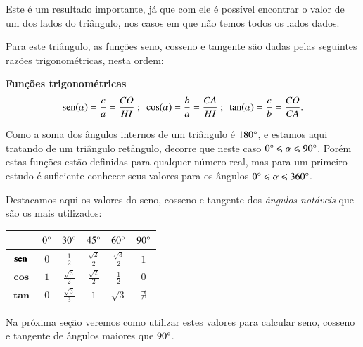  \vskip0.3cm

 Este é um resultado importante, já que com ele é possível encontrar o valor de um dos lados do triângulo, nos casos em que não temos todos os lados dados.

 Para este triângulo, as funções seno, cosseno e tangente são dadas pelas seguintes razões trigonométricas, nesta ordem:

 \vskip0.3cm

\colorbox{azul}{
 \begin{minipage}{0.9\linewidth}
 \begin{center}
 \textbf{Funções trigonométricas}
  \begin{eqnarray*}
   \operatorname{sen}(\alpha)= \frac{c}{a}= \frac{CO}{HI} \ ; \ \
   \cos(\alpha)= \frac{b}{a}= \frac{CA}{HI} \ ; \ \
   \tan(\alpha)= \frac{c}{b}= \frac{CO}{CA}.
 \end{eqnarray*}
 \end{center}
 \end{minipage}}

 \vskip0.3cm

 Como a soma dos ângulos internos de um triângulo é $180 \degree$, e estamos aqui tratando de um triângulo retângulo, decorre que neste caso $0 \degree \leqslant \alpha \leqslant 90 \degree$. Porém estas funções estão definidas para qualquer número real, mas para um primeiro estudo é suficiente conhecer seus valores para os ângulos $0 \degree \leqslant \alpha \leqslant 360 \degree$.

 Destacamos aqui os valores do seno, cosseno e tangente dos \emph{ângulos notáveis} que são os mais utilizados:

 \begin{table}[H]
 \centering
 \begin{tabular}{|c|c|c|c|c|c|} \hline
 \rowcolor{cinza}
               & $0 \degree$  & $30 \degree$  & $45 \degree$  & $60 \degree$ & $90 \degree$  \\\hline
  $\pmb{\operatorname{sen}}$ & $0$ &$\frac{1}{2}$ & $\frac{\sqrt{2}}{2}$ & $\frac{\sqrt{3}}{2}$ & $1$ \\\hline
  $\pmb{\cos}$ & $1$ & $\frac{\sqrt{3}}{2}$ & $\frac{\sqrt{2}}{2}$ & $\frac{1}{2}$ & $0$ \\\hline
  $\pmb{\tan}$ & $0$ & $\frac{\sqrt{3}}{3}$ & $1$ & $\sqrt{3}$ & $\nexists$ \\\hline
 \end{tabular}
\end{table}
 Na próxima seção veremos como utilizar estes valores para calcular seno, cosseno e tangente de ângulos maiores que $90 \degree$.


